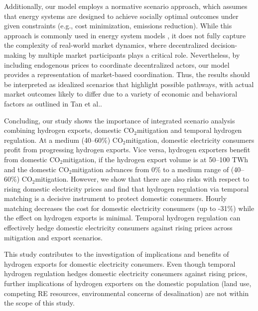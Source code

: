 \documentclass[5p,numafflabel]{elsarticle}
\newcommand{\co}{\ce{CO2}~}
\def\co{CO${}_2${\:}}
\begin{document}
Additionally, our model employs a normative scenario approach, which assumes that energy systems are designed to achieve socially optimal outcomes under given constraints (e.g., cost minimization, emissions reduction). While this approach is commonly used in energy system models \cite{Zeyen2023, Zeyen2024,Victoria2020,Franken2025,Neumann2024,Neumann2023,Neumann2022a,Neumann2021,Parzen2023,Horsch2018,Muller2024,Collins2018,Oyewo2023,Oyewo2024,Bauer2025,IEA2021}, it does not fully capture the complexity of real-world market dynamics, where decentralized decision-making by multiple market participants plays a critical role. Nevertheless, by including endogenous prices to coordinate decentralized actors, our model provides a representation of market-based coordination. Thus, the results should be interpreted as idealized scenarios that highlight possible pathways, with actual market outcomes likely to differ due to a variety of economic and behavioral factors as outlined in Tan et al.\cite{Tan2022}.



\label{sec:conclusion}



Concluding, our study shows the importance of integrated scenario analysis combining hydrogen exports, domestic \co mitigation and temporal hydrogen regulation.
At a medium (40--60\%) \co mitigation, domestic electricity consumers profit from progressing hydrogen exports. Vice versa, hydrogen exporters benefit from domestic \co mitigation, if the hydrogen export volume is at 50--100 TWh and the domestic \co mitigation advances from 0\% to a medium range of (40--60\%) \co mitigation. However, we show that there are also risks with respect to rising domestic electricity prices
and find that hydrogen regulation via temporal matching is a decisive instrument
to protect domestic consumers. Hourly matching decreases the cost for domestic electricity consumers (up to -31\%) while the effect on hydrogen exports is minimal. Temporal hydrogen regulation can effectively hedge domestic electricity consumers against rising prices across mitigation and export scenarios.

This study contributes to the investigation of implications and benefits of hydrogen exports for domestic electricity consumers. Even though temporal hydrogen regulation hedges domestic electricity consumers against rising prices, further implications of hydrogen exporters on the domestic population (land use, competing RE resources, environmental concerns of desalination) are not within the scope of this study.
\end{document}
